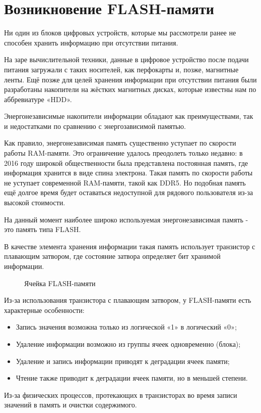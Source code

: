 \documentclass[a5paper, DIV=14, headings=openany, twoside=true,fontsize=10pt, titlepage]{scrreprt}
\newcommand{\quotes}[1]{«#1»}
\newcommand{\eng}[1]{\foreignlanguage{english}{#1}}
\newcommand{\qeng}[1]{\quotes{\foreignlanguage{english}{#1}}}
\begin{document}
\section{Возникновение \eng{FLASH}-памяти}
\par{Ни один из блоков цифровых устройств, которые мы рассмотрели ранее не способен хранить информацию при отсутствии питания.}
\par{На заре вычислительной техники, данные в цифровое устройство после подачи питания загружали с таких носителей, как перфокарты и, позже, магнитные ленты. Ещё позже для целей хранения информации при отсутствии питания были разработаны накопители на жёстких магнитных дисках, которые известны нам по аббревиатуре \qeng{HDD}.}
\par{Энергонезависимые накопители информации обладают как преимуществами, так и недостатками по сравнению с энергозависимой памятью.} 
\par{Как правило, энергонезависимая память существенно уступает по скорости работы \eng{RAM}-памяти. Это ограничение удалось преодолеть только недавно: в 2016 году широкой общественности была представлена постоянная память, где информация хранится в виде спина электрона. Такая память по скорости работы не уступает современной \eng{RAM}-памяти, такой как \eng{DDR5}. Но подобная память ещё долгое время будет оставаться недоступной для рядового пользователя из-за высокой стоимости.}
\par{На данный момент наиболее широко используемая энергонезависимая память - это память типа \eng{FLASH}.}
\par{В качестве элемента хранения информации такая память использует транзистор с плавающим затвором, где состояние затвора определяет бит хранимой информации.}
%
\begin{figure}[H]
\centering
\def\svgwidth{\columnwidth}

\caption{Ячейка \eng{FLASH}-памяти}
\end{figure}


\begin{samepage}
\par{Из-за использования транзистора с плавающим затвором, у \eng{FLASH}-памяти есть характерные особенности:
  \begin{itemize}
    \item Запись значения возможна только из логической \quotes{1} в логический \quotes{0};
    \item Удаление информации возможно из группы ячеек одновременно (блока);
    \item Удаление и запись информации приводят к деградации ячеек памяти;
    \item Чтение также приводит к деградации ячеек памяти, но в меньшей степени.
  \end{itemize}}
\end{samepage}

\par{Из-за физических процессов, протекающих в транзисторах во время записи значений в память и очистки содержимого.}
\end{document}
